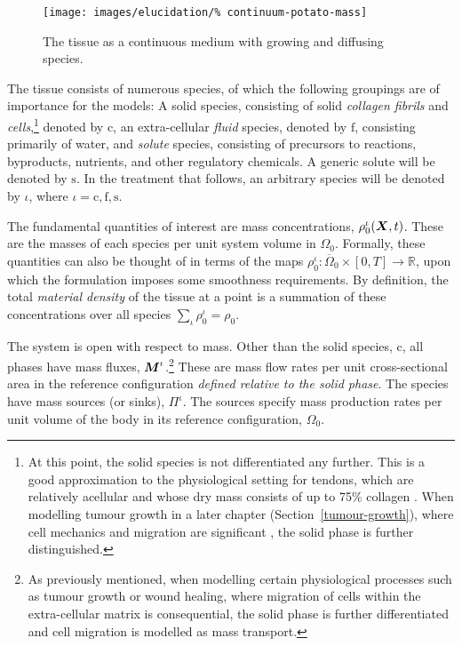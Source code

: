 \begin{figure}
  \centering
  \texttt{[image: images/elucidation/\%
    continuum-potato-mass]}
  \caption{The tissue as a continuous medium with growing and
    diffusing species.}
  \label{continuum-potato-mass}
\end{figure}

The tissue consists of numerous species, of which the following
groupings are of importance for the models: A solid species,
consisting of solid \emph{collagen fibrils} and
\emph{cells},\footnote{At this point, the solid species is not
  differentiated any further. This is a good approximation to the
  physiological setting for tendons, which are relatively acellular
  and whose dry mass consists of up to 75\% collagen
  \citep{Nordinetal:2001}. When modelling tumour growth in a later
  chapter (Section~\ref{tumour-growth}), where cell mechanics and
  migration are significant \citep{namyetal:04}, the solid phase is
  further distinguished.} denoted by $\mathrm{c}$, an extra-cellular
\emph{fluid} species, denoted by $\mathrm{f}$, consisting primarily of
water, and \emph{solute} species, consisting of precursors to
reactions, byproducts, nutrients, and other regulatory chemicals. A
generic solute will be denoted by $\mathrm{s}$. In the treatment that
follows, an arbitrary species will be denoted by $\iota$, where $\iota
= \mathrm{c,f,s}$.

The fundamental quantities of interest are mass concentrations,
$\rho_0^\iota(\mbox{\boldmath$ X$},t)$. These are the masses of each species per unit
system volume in $\Omega_0$. Formally, these quantities can also be
thought of in terms of the maps $\rho_0^\iota: \overline{\Omega}_0
\times [0,T] \rightarrow \mathbb{R}$, upon which the formulation
imposes some smoothness requirements. By definition, the total {\em
  material density} of the tissue at a point is a summation of these
concentrations over all species $\sum\limits_{\iota}\rho_0^\iota =
\rho_0$.

The system is open with respect to mass. Other than the solid species,
$\mathrm{c}$, all phases have mass fluxes, $\mbox{\boldmath$ M$}^\iota$.\footnote{As
  previously mentioned, when modelling certain physiological processes
  such as tumour growth or wound healing, where migration of cells
  within the extra-cellular matrix is consequential, the solid phase
  is further differentiated and cell migration is modelled as mass
  transport.}  These are mass flow rates per unit cross-sectional area
in the reference configuration \emph{defined relative to the solid
  phase}. The species have mass sources (or sinks), $\Pi^\iota$. The
sources specify mass production rates per unit volume of the body in
its reference configuration, $\Omega_0$.

